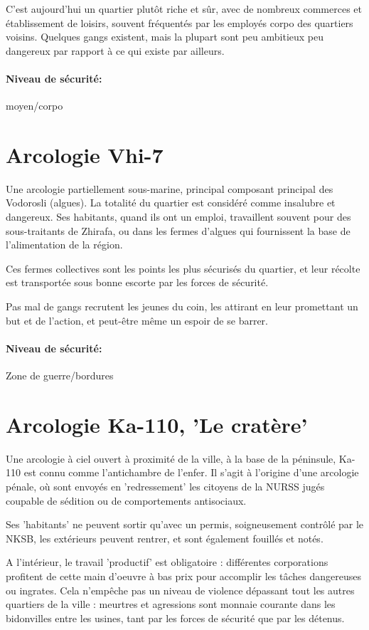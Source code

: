 \documentclass[10pt,a4paper]{book}
\begin{document}
C'est aujourd'hui un quartier plutôt riche et sûr, avec de nombreux commerces et établissement de loisirs, souvent fréquentés par les employés corpo des quartiers voisins. Quelques gangs existent, mais la plupart sont peu ambitieux peu dangereux par rapport à ce qui existe par ailleurs.
\paragraph{Niveau de sécurité:}moyen/corpo
\section{Arcologie Vhi-7}
Une arcologie partiellement sous-marine, principal composant principal des Vodorosli (algues). La totalité du quartier est considéré comme insalubre et dangereux. Ses habitants, quand ils ont un emploi, travaillent souvent pour des sous-traitants de Zhirafa, ou dans les fermes d'algues qui fournissent la base de l'alimentation de la région. 

Ces fermes collectives sont les points les plus sécurisés du quartier, et leur récolte est transportée sous bonne escorte par les forces de sécurité.

Pas mal de gangs recrutent les jeunes du coin, les attirant en leur promettant un but et de l'action, et peut-être même un espoir de se barrer.
\paragraph{Niveau de sécurité:} Zone de guerre/bordures
\section{Arcologie Ka-110, 'Le cratère'}
Une arcologie à ciel ouvert à proximité de la ville, à la base de la péninsule, Ka-110 est connu comme l'antichambre de l'enfer. Il s'agit à l'origine d'une arcologie pénale, où sont envoyés en 'redressement' les citoyens de la NURSS jugés coupable de sédition ou de comportements antisociaux. 

Ses 'habitants' ne peuvent sortir qu'avec un permis, soigneusement contrôlé par le NKSB, les extérieurs peuvent rentrer, et sont également fouillés et notés.

A l'intérieur, le travail 'productif' est obligatoire : différentes corporations profitent de cette main d'oeuvre à bas prix pour accomplir les tâches dangereuses ou ingrates. Cela n'empêche pas un niveau de violence dépassant tout les autres quartiers de la ville : meurtres et agressions sont monnaie courante dans les bidonvilles entre les usines, tant par les forces de sécurité que par les détenus.
\end{document}
